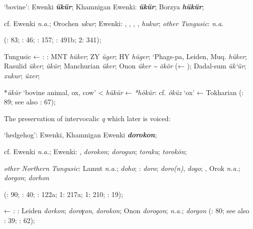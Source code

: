 \documentclass[output=paper,colorlinks,citecolor=brown]{langscibook}
\begin{document}
    \ex ‘bovine’:  Ewenki \textbf{\textit{ükür}}; Khamnigan Ewenki:  \textbf{\textit{ükür}}; Borzya \textbf{\textit{hükür}};

    cf.  Ewenki \textit{n.a.}; Orochen \textit{ukur};  Ewenki: , , , ,  \textit{hukur}; \textit{other Tungusic}: \textit{n.a}.
    
    (\citealt{Castrén1856}: 83; \citealt{Janhunen1991}: 46; \citealt{Chaoke2014a}: 157; \citealt{Vasilevic1958}: 491b; \citealt{Cincius1975B} 2: 341);

    Tungusic ← : : MNT \textit{hüker}; ZY \textit{üger}; HY \textit{hüger}; ‘Phags{}-pa, Leiden, Muq. \textit{hüker}; Rasulid \textit{üker};  \textit{ükür}; Manchurian  \textit{üker}; Onon  \textit{üker {\textasciitilde} ökör} (← ); Dadal-sum  \textit{ük`ür};  \textit{xukur};  \textit{üxer};

     *\textit{ükür} ‘bovine animal, ox, cow’ < \textit{hükür} ←  \textit{*hökür}: cf.  \textit{öküz} ‘ox’ ← Tokharian (\citealt{Khabtagaeva2017}: 89; see also \citealt{Doerfer1985}: 67);

\z

    \ex The preservation of  intervocalic \textit{q} which later is voiced:

\ea ‘hedgehog’:  Ewenki, Khamnigan Ewenki \textbf{\textit{dorokon}};

    cf.  Ewenki \textit{n.a.};  Ewenki: ,  \textit{dorokon};  \textit{dorogun};  \textit{toraku};  \textit{torokōn};

    \textit{other Northern Tungusic}: Lamut \textit{n.a.};  \textit{doho}; \textit{}:  \textit{doro};  \textit{doro(n)},  \textit{dogo}; , Orok \textit{n.a.};  \textit{dorgon};  \textit{dorhon} 
    
    (\citealt{Castrén1856}: 90; \citealt{Janhunen1991}: 40; \citealt{Vasilevic1958}: 122a; \citealt{Cincius1975B} 1: 217a; \citealt{Hauer1952} 1: 210; \citealt{Stary1990}: 19);

    ← : : Leiden \textit{dorkon};  \textit{doroγon},   \textit{dorokon}; Onon  \textit{dorogon};  \textit{n.a.};  \textit{dorgon} (\citealt{Khabtagaeva2017}: 80; see also \citealt{Doerfer1985}: 39; \citealt{Rozycki1994}: 62);
\end{document}
